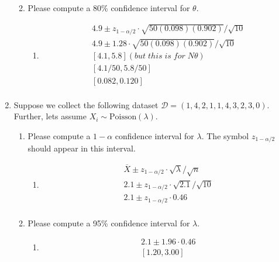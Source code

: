 \documentclass[krantz1,ChapterTOCs]{krantz}
\begin{document}
\begin{enumerate}
\begin{enumerate}
\begin{enumerate}
{            } 
        \end{enumerate}

            \item Please compute a 80\% confidence interval for $\theta$.
            \begin{enumerate}
            \item {
            \color{red} 
                \begin{align}
                 4.9 \pm z_{1-\alpha/2} \cdot  \sqrt{50 (0.098)(0.902)} /\sqrt{10}\\
                 4.9 \pm 1.28 \cdot  \sqrt{50 (0.098)(0.902)} /\sqrt{10}\\
                 [4.1, 5.8 ] (but\; this\; is\; for\; N\theta)\\
                 [4.1/50 , 5.8/50 ]\\
                 [0.082, 0.120]\\
                \end{align}
            } 
        \end{enumerate}

        \end{enumerate}
        

    \item Suppose we collect the following dataset $\mathcal{D} = (1, 4, 2, 1, 1, 4, 3, 2, 3, 0)$. Further, lets assume $X_{i} \sim \text{Poisson}(\lambda)$.
        \begin{enumerate}
            \item Please compute a $1-\alpha$ confidence interval for $\lambda$. The symbol $z_{1-\alpha/2}$ should appear in this interval. 
            \begin{enumerate}
            \item {
            \color{red} 
            
            \begin{align}
                \overline{X} \pm z_{1-\alpha/2} \cdot   \sqrt{\lambda}/\sqrt{n}\\
                2.1 \pm z_{1-\alpha/2} \cdot   \sqrt{2.1}/\sqrt{10} \\ 
                2.1 \pm z_{1-\alpha/2} \cdot   0.46\\ 
            \end{align}
        
            } 
        \end{enumerate}

            \item Please compute a 95\% confidence interval for $\lambda$.
        \begin{enumerate}
            \item {
            \color{red} 
                \begin{align}
                    2.1 \pm 1.96 \cdot   0.46\\ 
                    [1.20,3.00]
                \end{align}
        
}
\end{enumerate}
\end{enumerate}
\end{enumerate}
\end{document}
